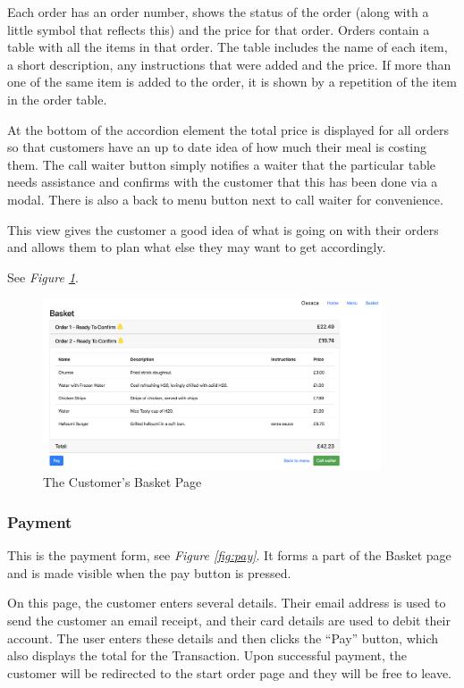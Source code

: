 \documentclass[12pt, twoside, a4paper]{report}
\begin{document}
Each order has an order number, shows the status of the order (along with a little symbol that reflects this) and the price for that order.
Orders contain a table with all the items in that order.
The table includes the name of each item, a short description, any instructions that were added and the price.
If more than one of the same item is added to the order, it is shown by a repetition of the item in the order table.

At the bottom of the accordion element the total price is displayed for all orders so that customers have an up to date idea of how much their meal is costing them.
The call waiter button simply notifies a waiter that the particular table needs assistance and confirms with the customer that this has been done via a modal.
There is also a back to menu button next to call waiter for convenience.

This view gives the customer a good idea of what is going on with their orders and allows them to plan what else they may want to get accordingly.

See \textit{Figure \ref{fig:basket}}.

\begin{figure}[H]
  \centering
  \includegraphics[width=10cm]{basket.png}
  \caption{The Customer's Basket Page}
  \label{fig:basket}
\end{figure}

\subsubsection*{Payment}
This is the payment form, see \textit{Figure \ref{fig:pay}}. It forms a part of the Basket page and is made visible when the pay button is pressed.

On this page, the customer enters several details. Their email address is used to send the customer an email receipt, and their card details are used to debit their account.
The user enters these details and then clicks the “Pay” button, which also displays the total for the Transaction.
Upon successful payment, the customer will be redirected to the start order page and they will be free to leave.
\end{document}
